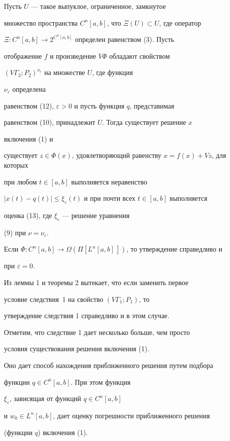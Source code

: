 \begin{cor} Пусть $U$ --- такое выпуклое, ограниченное, замкнутое


множество пространства $C^n[a,b]$, что $\Xi(U)\subset U$, где оператор


$\Xi:C^n[a,b]\to 2^{C^n[a,b]}$ определен равенством (3). Пусть


отображение $f$ и произведение $V\Phi$ обладают свойством


$(V\Gamma_2;P_2)^{\nu_\varepsilon}$ на множестве $U$, где функция


$\nu_\varepsilon$ определена


равенством (12), $\varepsilon>0$ и пусть функция $q$, представимая


равенством (10), принадлежит $U$. Тогда существует решение $x$


включения (1) и


существует $z\in\Phi(x)$, удовлетворяющий равенству $x=f(x)+Vz$, для которых


при любом $t\in[a,b]$ выполняется неравенство


$|x(t)-q(t)|\le\xi_\varepsilon(t)$ и при почти всех $t\in[a,b]$ выполняется


оценка (13), где $\xi_\varepsilon$ --- решение уравнения


(9) при $\nu=\nu_\varepsilon$.





Если $\Phi:C^n[a,b]\to\Omega(\Pi[L^n[a,b]\,])$, то утверждение справедливо и


при $\varepsilon=0$.


\end{cor}





\begin{note} Из леммы 1 и теоремы 2 вытекает, что если заменить первое


условие следствия~1 на свойство $(V\Gamma_1;P_1)$, то


утверждение следствия 1 справедливо и в этом случае.


\end{note}





\begin{note} Отметим, что следствие 1 дает несколько больше, чем просто


условия существования решения включения (1).


Оно дает способ нахождения приближенного решения путем подбора


функции $q\in C^n[a,b]$. При этом функция


$\xi_\varepsilon$, зависящая от функций $q\in C^n[a,b]$


и $w_0\in L^n[a,b]$, дает оценку погрешности приближенного решения


(функции $q$) включения (1).


\end{note}





